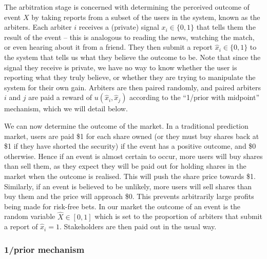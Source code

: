 \documentclass[10pt,a4paper]{article}
\theoremstyle{plain}
\theoremstyle{definition}
\begin{document}
The arbitration stage is concerned with determining the perceived outcome of
event $X$ by taking reports from a subset of the users in the system, known as
the arbiters. Each arbiter $i$ receives a (private) signal $x_i \in \{0,1\}$
that tells them the result of the event -- this is analogous to reading the
news, watching the match, or even hearing about it from a friend. They then
submit a report $\hat{x}_i \in \{0,1\}$ to the system that tells us what they
believe the outcome to be. Note that since the signal they receive is private,
we have no way to know whether the user is reporting what they truly believe,
or whether they are trying to manipulate the system for their own gain.
Arbiters are then paired randomly, and paired arbiters $i$ and $j$ are paid a
reward of $u(\hat{x}_i, \hat{x}_j)$ according to the ``1/prior with midpoint''
mechanism, which we will detail below.

We can now determine the outcome of the market. In a traditional prediction
market, users are paid \$1 for each share owned (or they must buy shares back
at \$1 if they have shorted the security) if the event has a positive outcome,
and \$0 otherwise. Hence if an event is almost certain to occur, more users
will buy shares than sell them, as they expect they will be paid out for
holding shares in the market when the outcome is realised. This will push the
share price towards \$1. Similarly, if an event is believed to be unlikely,
more users will sell shares than buy them and the price will approach \$0. This
prevents arbitrarily large profits being made for risk-free bets. In our market
the outcome of an event is the random variable $\hat{X} \in [0,1]$ which is set
to the proportion of arbiters that submit a report of $\hat{x}_i=1$.
Stakeholders are then paid out in the usual way.

\subsubsection{1/prior mechanism}

\label{sec:oneOverPrior}
\end{document}

